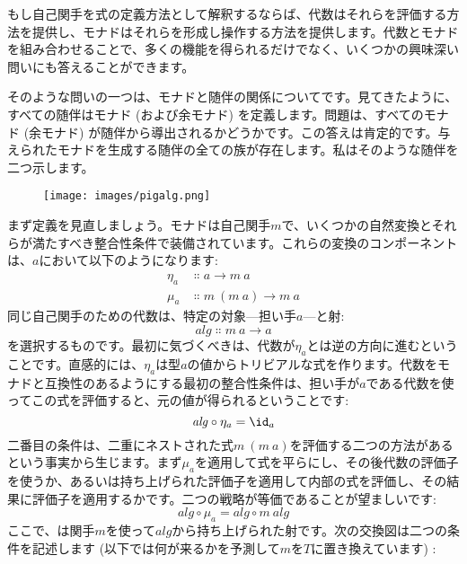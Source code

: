
\lettrine[lhang=0.17]{も}{し}自己関手を式の定義方法として解釈するならば、代数はそれらを評価する方法を提供し、モナドはそれらを形成し操作する方法を提供します。代数とモナドを組み合わせることで、多くの機能を得られるだけでなく、いくつかの興味深い問いにも答えることができます。

そのような問いの一つは、モナドと随伴の関係についてです。見てきたように、すべての随伴はモナド (および余モナド) を定義します。問題は、すべてのモナド (余モナド) が随伴から導出されるかどうかです。この答えは肯定的です。与えられたモナドを生成する随伴の全ての族が存在します。私はそのような随伴を二つ示します。

\begin{figure}[H]
  \centering
  \texttt{[image: images/pigalg.png]}
\end{figure}

\noindent
まず定義を見直しましょう。モナドは自己関手$m$で、いくつかの自然変換とそれらが満たすべき整合性条件で装備されています。これらの変換のコンポーネントは、$a$において以下のようになります: 
\begin{align*}
  \eta_a & \Colon a \to m\ a         \\
  \mu_a  & \Colon m\ (m\ a) \to m\ a
\end{align*}
同じ自己関手のための代数は、特定の対象---担い手$a$---と射: 
\[\mathit{alg} \Colon m\ a \to a\]
を選択するものです。最初に気づくべきは、代数が$\eta_a$とは逆の方向に進むということです。直感的には、$\eta_a$は型$a$の値からトリビアルな式を作ります。代数をモナドと互換性のあるようにする最初の整合性条件は、担い手が$a$である代数を使ってこの式を評価すると、元の値が得られるということです: 
\[\mathit{alg} \circ \eta_a = \id_a\]
二番目の条件は、二重にネストされた式$m\ (m\ a)$を評価する二つの方法があるという事実から生じます。まず$\mu_a$を適用して式を平らにし、その後代数の評価子を使うか、あるいは持ち上げられた評価子を適用して内部の式を評価し、その結果に評価子を適用するかです。二つの戦略が等価であることが望ましいです: 
\[\mathit{alg} \circ \mu_a = \mathit{alg} \circ m\ \mathit{alg}\]
ここで、は関手$m$を使って$\mathit{alg}$から持ち上げられた射です。次の交換図は二つの条件を記述します (以下では何が来るかを予測して$m$を$T$に置き換えています) : 

